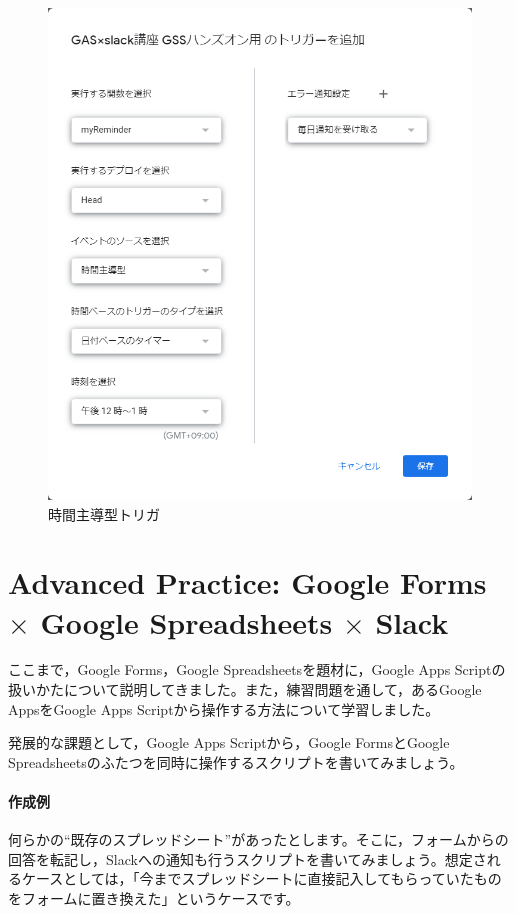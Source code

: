 \documentclass[uplatex,a4j]{jsarticle}
\begin{document}
\begin{figure}[H]
 \centering
 \includegraphics[keepaspectratio, scale=0.7]{images/time_based_trigger.png}
 \caption{時間主導型トリガ}
 \label{fig:time_based_trigger}
\end{figure}

\section{Advanced Practice: Google Forms $\times$ Google Spreadsheets $\times$ Slack}


ここまで，Google Forms，Google Spreadsheetsを題材に，Google Apps Scriptの扱いかたについて説明してきました。また，練習問題を通して，あるGoogle AppsをGoogle Apps Scriptから操作する方法について学習しました。

発展的な課題として，Google Apps Scriptから，Google FormsとGoogle Spreadsheetsのふたつを同時に操作するスクリプトを書いてみましょう。

\paragraph{作成例} 
何らかの``既存のスプレッドシート''があったとします。そこに，フォームからの回答を転記し，Slackへの通知も行うスクリプトを書いてみましょう。想定されるケースとしては，「今までスプレッドシートに直接記入してもらっていたものをフォームに置き換えた」というケースです。
\end{document}
